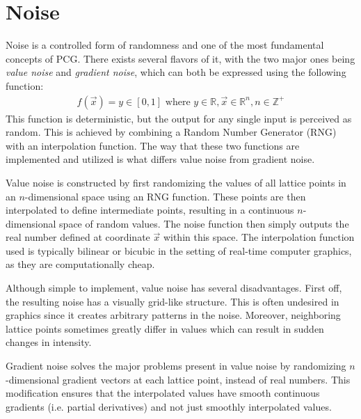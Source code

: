 \section{Noise}

Noise is a controlled form of randomness and one of the most fundamental concepts of PCG.
There exists several flavors of it, with the two major ones being \textit{value noise} and \textit{gradient noise}, which can both be expressed using the following function:
\begin{gather}
  f(\vec x) = y \in [0, 1] \text{ where }
  y \in \mathbb{R},
  \vec x \in \mathbb{R}^n,
  n \in \mathbb{Z}^+
\end{gather}
This function is deterministic, but the output for any single input is perceived as random.
This is achieved by combining a Random Number Generator (RNG) with an interpolation function.
The way that these two functions are implemented and utilized is what differs value noise from gradient noise.

Value noise is constructed by first randomizing the values of all lattice points in an $n$-dimensional space using an RNG function.
These points are then interpolated to define intermediate points, resulting in a continuous $n$-dimensional space of random values.
The noise function then simply outputs the real number defined at coordinate $\vec x$ within this space.
The interpolation function used is typically bilinear or bicubic in the setting of real-time computer graphics, as they are computationally cheap.

Although simple to implement, value noise has several disadvantages.
First off, the resulting noise has a visually grid-like structure.
This is often undesired in graphics since it creates arbitrary patterns in the noise.
Moreover, neighboring lattice points sometimes greatly differ in values which can result in sudden changes in intensity.

Gradient noise solves the major problems present in value noise by randomizing $n$-dimensional gradient vectors at each lattice point, instead of real numbers.
This modification ensures that the interpolated values have smooth continuous gradients (i.e. partial derivatives) and not just smoothly interpolated values.

